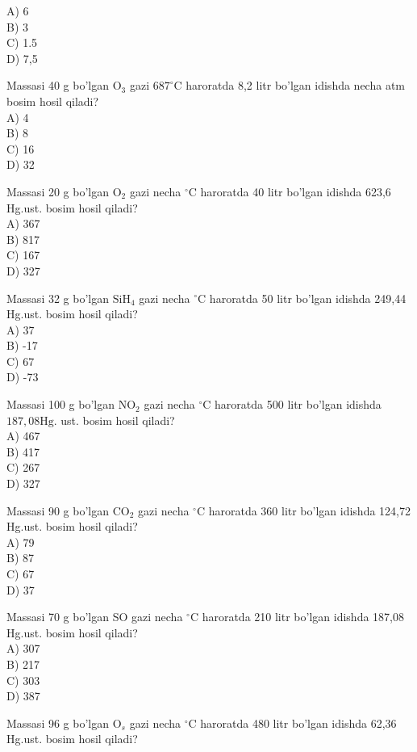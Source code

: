 A) 6\\
B) 3\\
C) 1.5\\
D) 7,5
  \item Massasi 40 g bo'lgan $\mathrm{O}_{3}$ gazi $687^{\circ} \mathrm{C}$ haroratda 8,2 litr bo'lgan idishda necha atm bosim hosil qiladi?\\
A) 4\\
B) 8\\
C) 16\\
D) 32
  \item Massasi 20 g bo'lgan $\mathrm{O}_{2}$ gazi necha ${ }^{\circ} \mathrm{C}$ haroratda 40 litr bo'lgan idishda 623,6 Hg.ust. bosim hosil qiladi?\\
A) 367\\
B) 817\\
C) 167\\
D) 327
  \item Massasi 32 g bo'lgan $\mathrm{SiH}_{4}$ gazi necha ${ }^{\circ} \mathrm{C}$ haroratda 50 litr bo'lgan idishda 249,44 Hg.ust. bosim hosil qiladi?\\
A) 37\\
B) -17\\
C) 67\\
D) -73
  \item Massasi 100 g bo'lgan $\mathrm{NO}_{2}$ gazi necha ${ }^{\circ} \mathrm{C}$ haroratda 500 litr bo'lgan idishda $187,08 \mathrm{Hg}$. ust. bosim hosil qiladi?\\
A) 467\\
B) 417\\
C) 267\\
D) 327
  \item Massasi 90 g bo'lgan $\mathrm{CO}_{2}$ gazi necha ${ }^{\circ} \mathrm{C}$ haroratda 360 litr bo'lgan idishda 124,72 Hg.ust. bosim hosil qiladi?\\
A) 79\\
B) 87\\
C) 67\\
D) 37
  \item Massasi 70 g bo'lgan SO gazi necha ${ }^{\circ} \mathrm{C}$ haroratda 210 litr bo'lgan idishda 187,08 Hg.ust. bosim hosil qiladi?\\
A) 307\\
B) 217\\
C) 303\\
D) 387
  \item Massasi 96 g bo'lgan $\mathrm{O}_{s}$ gazi necha ${ }^{\circ} \mathrm{C}$ haroratda 480 litr bo'lgan idishda 62,36 Hg.ust. bosim hosil qiladi?\\
